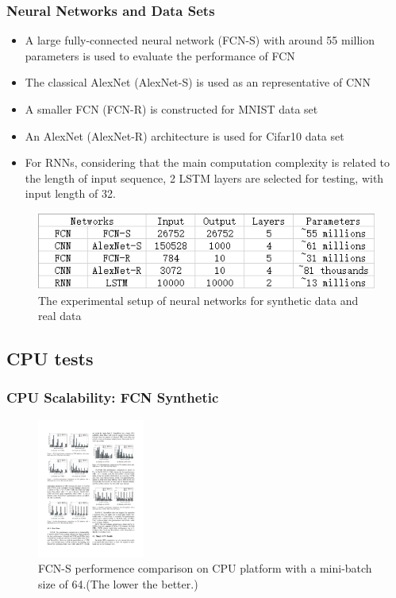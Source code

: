 \begin{frame}
  \MyLogo
  \frametitle{Neural Networks and Data Sets}  

\medskip

\begin{itemize}

\item A large fully-connected neural network (\alert{FCN-S}) with around 55 million parameters is used to evaluate the performance of FCN

\item The classical AlexNet (\alert{AlexNet-S}) is used as an representative of CNN

\item A smaller FCN (\alert{FCN-R}) is constructed for MNIST data set

\item An AlexNet (\alert{AlexNet-R}) architecture is used for Cifar10 data set

\item For RNNs, considering that the main computation complexity is related to the length of input sequence, 2 LSTM layers are selected for testing, with input length of 32.

\end{itemize}

\begin{figure}[htbp] 
\includegraphics[height=1in]{figures/models.png} 
\caption{The experimental setup of neural networks for synthetic data and real data}
\end{figure}
	
\end{frame}

\subsection{CPU tests}

\begin{frame}
	\MyLogo
	\frametitle{CPU Scalability: FCN Synthetic}  
	\begin{figure}[htbp] 
		\includegraphics[height=1.8in]{figures/FCN-S1.pdf} 
		\caption{FCN-S performence comparison on CPU platform with a mini-batch size of 64.(The lower the better.)}
	\end{figure}
\end{frame}

